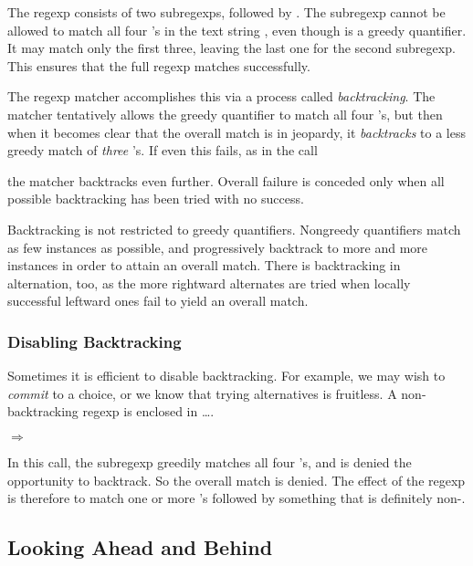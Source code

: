 
The regexp consists of two subregexps,  followed by .
The subregexp  cannot be allowed to match all four 's
in the text string , even though \code{*} is a greedy
quantifier.  It may match only the first three, leaving the last one
for the second subregexp.  This ensures that the full regexp matches
successfully.

The regexp matcher accomplishes this via a process called
\emph{backtracking}.  The matcher tentatively allows the greedy
quantifier to match all four 's, but then when it becomes
clear that the overall match is in jeopardy, it \emph{backtracks} to a
less greedy match of {\em three} 's.  If even this fails, as
in the call


the matcher backtracks even further.  Overall failure is conceded only
when all possible backtracking has been tried with no success.

Backtracking is not restricted to greedy quantifiers.  Nongreedy
quantifiers match as few instances as possible, and progressively
backtrack to more and more instances in order to attain an overall
match.  There is backtracking in alternation, too, as the more
rightward alternates are tried when locally successful leftward ones
fail to yield an overall match.

\subsubsection {Disabling Backtracking}

Sometimes it is efficient to disable backtracking.  For example, we
may wish to \emph{commit} to a choice, or we know that trying
alternatives is fruitless.  A non-backtracking regexp is enclosed in
\ldots\code{)}.

 $\Rightarrow$ 

In this call, the subregexp  greedily matches all four
's, and is denied the opportunity to backtrack.  So the
overall match is denied.  The effect of the regexp is therefore to
match one or more 's followed by something that is definitely
non-.

\subsection {Looking Ahead and Behind}

